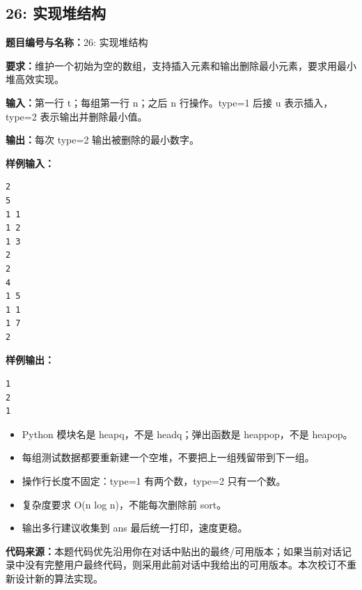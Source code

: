 \documentclass[10pt,a4paper,fontset=none]{ctexart}
\newcommand{\codesource}{\par\noindent\textbf{代码来源：}本题代码优先沿用你在对话中贴出的最终/可用版本；如果当前对话记录中没有完整用户最终代码，则采用此前对话中我给出的可用版本。本次校订不重新设计新的算法实现。\par\vspace{0.2em}}
\begin{document}
\subsection{26: 实现堆结构}
\begin{taskbox}
\textbf{题目编号与名称：}26: 实现堆结构\par
\textbf{要求：}维护一个初始为空的数组，支持插入元素和输出删除最小元素，要求用最小堆高效实现。\par
\textbf{输入：}第一行 t；每组第一行 n；之后 n 行操作。type=1 后接 u 表示插入，type=2 表示输出并删除最小值。\par
\textbf{输出：}每次 type=2 输出被删除的最小数字。\par
\textbf{样例输入：}
\begin{lstlisting}[style=sample]
2
5
1 1
1 2
1 3
2
2
4
1 5
1 1
1 7
2
\end{lstlisting}
\textbf{样例输出：}
\begin{lstlisting}[style=sample]
1
2
1
\end{lstlisting}
\end{taskbox}
\begin{mistakebox}
\begin{itemize}
  \item Python 模块名是 heapq，不是 headq；弹出函数是 heappop，不是 heapop。
  \item 每组测试数据都要重新建一个空堆，不要把上一组残留带到下一组。
  \item 操作行长度不固定：type=1 有两个数，type=2 只有一个数。
  \item 复杂度要求 O(n log n)，不能每次删除前 sort。
  \item 输出多行建议收集到 ans 最后统一打印，速度更稳。
\end{itemize}
\end{mistakebox}
\codesource
\end{document}
